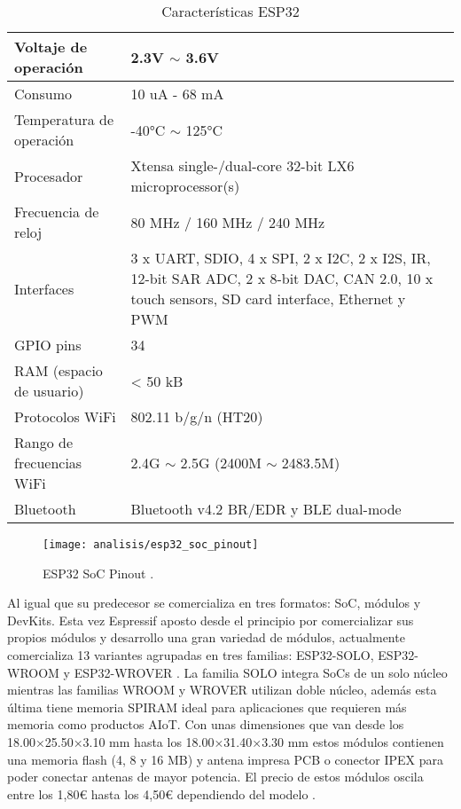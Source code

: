 \documentclass[../proyecto.tex]{subfiles}
\begin{document}
\begin{table}[H]
\centering
\begin{tabular}{ |l|m{20em}| }
\hline
Voltaje de operación      & 2.3V $\sim$ 3.6V          \\ \hline
Consumo                   & 10 uA - 68 mA  \\ \hline
Temperatura de operación  & -40°C $\sim$ 125°C        \\ \hline
Procesador                & Xtensa single-/dual-core 32-bit LX6 microprocessor(s)   \\ \hline
Frecuencia de reloj       & 80 MHz / 160 MHz  / 240 MHz        \\ \hline
Interfaces                & 3 x UART, SDIO, 4 x SPI, 2 x I2C, 2 x I2S, IR, 12-bit SAR ADC, 2 x 8-bit DAC, CAN 2.0, 10 x touch sensors, SD card interface, Ethernet y PWM                           \\ \hline
GPIO pins                 & 34                        \\ \hline
RAM (espacio de usuario)  & < 50 kB                     \\ \hline
Protocolos WiFi           & 802.11 b/g/n (HT20)       \\ \hline
Rango de frecuencias WiFi & 2.4G $\sim$ 2.5G (2400M $\sim$ 2483.5M) \\ \hline
Bluetooth           &  Bluetooth v4.2 BR/EDR y BLE dual-mode  \\ \hline
\end{tabular}
\caption{Características ESP32}
\label{table:caracteristicas_esp32}
\end{table}

\begin{figure}[H]
\centering
\texttt{[image: analisis/esp32\_soc\_pinout]}
\caption{ESP32 SoC Pinout  \cite{esp32_soc_pinout}.}
\label{fig:esp32_soc_pinout}
\end{figure}

Al igual que su predecesor se comercializa en tres formatos: SoC, módulos y DevKits. Esta vez Espressif aposto desde el principio por comercializar sus propios módulos y desarrollo una gran variedad de módulos, actualmente comercializa 13 variantes agrupadas en tres familias: ESP32-SOLO, ESP32-WROOM y ESP32-WROVER \cite{espressif_products_ordering_information}. La familia SOLO integra SoCs de un solo núcleo mientras las familias WROOM y WROVER utilizan doble núcleo, además esta última tiene memoria SPIRAM ideal para aplicaciones que requieren más memoria como productos AIoT. Con unas dimensiones que van desde los 18.00×25.50×3.10 mm hasta los 18.00×31.40×3.30 mm estos módulos contienen una memoria flash (4, 8 y 16 MB) y antena impresa PCB o conector IPEX para poder conectar antenas de mayor potencia. El precio de estos módulos oscila entre los 1,80€ hasta los 4,50€ dependiendo del modelo \cite{espressif_provider_digikey} \cite{espressif_provider_mouser}.\\
\end{document}
